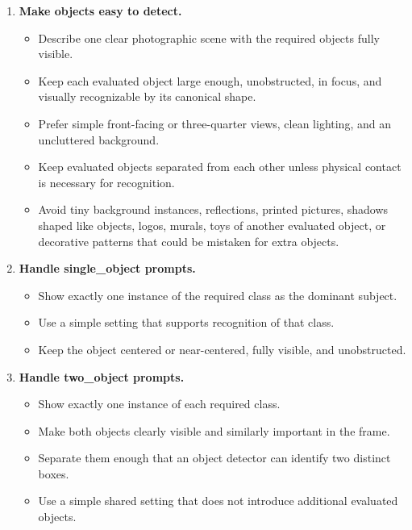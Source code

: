 \begin{tcolorbox}
\begin{enumerate}[leftmargin=1.5em, itemsep=0.2em]
    \item \textbf{Make objects easy to detect.}
    \begin{itemize}[leftmargin=1.5em, nosep]
        \item Describe one clear photographic scene with the required objects fully visible.
        \item Keep each evaluated object large enough, unobstructed, in focus, and visually recognizable by its canonical shape.
        \item Prefer simple front-facing or three-quarter views, clean lighting, and an uncluttered background.
        \item Keep evaluated objects separated from each other unless physical contact is necessary for recognition.
        \item Avoid tiny background instances, reflections, printed pictures, shadows shaped like objects, logos, murals, toys of another evaluated object, or decorative patterns that could be mistaken for extra objects.
    \end{itemize}

    \item \textbf{Handle single\_object prompts.}
    \begin{itemize}[leftmargin=1.5em, nosep]
        \item Show exactly one instance of the required class as the dominant subject.
        \item Use a simple setting that supports recognition of that class.
        \item Keep the object centered or near-centered, fully visible, and unobstructed.
    \end{itemize}

    \item \textbf{Handle two\_object prompts.}
    \begin{itemize}[leftmargin=1.5em, nosep]
        \item Show exactly one instance of each required class.
        \item Make both objects clearly visible and similarly important in the frame.
        \item Separate them enough that an object detector can identify two distinct boxes.
        \item Use a simple shared setting that does not introduce additional evaluated objects.
    \end{itemize}


\end{enumerate}
\end{tcolorbox}
